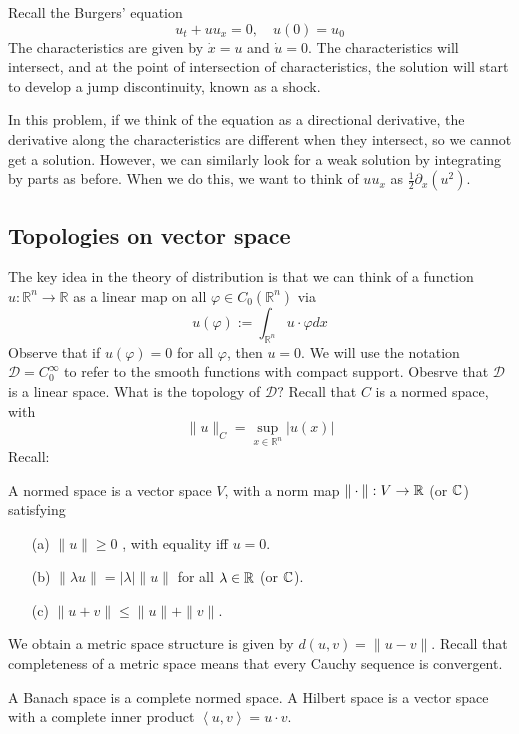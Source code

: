 \begin{example}
Recall the Burgers' equation 
$$
u_{t}+u u_{x}=0, \quad u(0)=u_{0}
$$
The characteristics are given by $\dot{x}=u$ and $\dot{u}=0$. The characteristics will intersect, and at the point of intersection of characteristics, the solution will start to develop a jump discontinuity, known as a shock. 

In this problem, if we think of the equation as a directional derivative, the derivative along the characteristics are different when they intersect, so we cannot get a solution. However, we can similarly look for a weak solution by integrating by parts as before. When we do this, we want to think of $u u_{x}$ as $\frac{1}{2} \partial_{x}\left(u^{2}\right)$.
\end{example}

\subsection{Topologies on vector space}
The key idea in the theory of distribution is that we can think of a function $u: \mathbb{R}^{n} \rightarrow \mathbb{R}$ as a linear map on all $\varphi \in C_{0}\left(\mathbb{R}^{n}\right)$ via
$$
u(\varphi):=\int_{\mathbb{R}^{n}} u \cdot \varphi d x
$$
Observe that if $u(\varphi)=0$ for all $\varphi$, then $u=0$.
We will use the notation $\mathcal{D}=C_{0}^{\infty}$ to refer to the smooth functions with compact support. Obesrve that $\mathcal{D}$ is a linear space. What is the topology of $\mathcal{D} ?$ Recall that $C$ is a normed space, with
$$
\|u\|_{C}=\sup _{x \in \mathbb{R}^{n}}|u(x)|
$$
Recall:

\begin{definition}
     A normed space is a vector space $V$, with a norm map $\|\cdot \| : V\to \mathbb{R}$ (or $\mathbb{C}$) satisfying 
    \begin{itemize}
        \item[(a)] $\|u\|\ge 0$ , with equality iff $u=0$.
        \item[(b)]  $\|\lambda u\| = |\lambda | \| u \|$  for all $\lambda \in \mathbb{R}$ (or $\mathbb{C}$).
        \item[(c)] $\|u+v\|\le \|u\| + \|v\|$. 
    \end{itemize}
    We obtain a metric space structure is given by $d(u, v)=\|u-v\| .$ Recall that completeness of a metric space means that every Cauchy sequence is convergent.
\end{definition}

\begin{definition}
 A Banach space is a complete normed space. A Hilbert space is a vector space with a complete inner product $\left< u,v \right> = u\cdot v$.
\end{definition}

